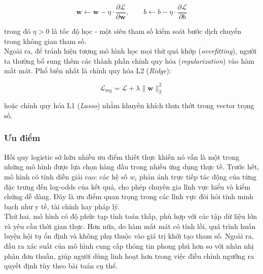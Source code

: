\begin{equation}
  \mathbf{w} \leftarrow \mathbf{w} - \eta \cdot \frac{\partial \mathcal{L}}{\partial \mathbf{w}},
  \qquad
  b \leftarrow b - \eta \cdot \frac{\partial \mathcal{L}}{\partial b}
  \label{eq:update}
\end{equation}
 
\noindent trong đó $\eta > 0$ là tốc độ học - một siêu tham số kiểm soát bước dịch chuyển trong không gian tham số.\\
 
Ngoài ra, để tránh hiện tượng mô hình học mọi thứ quá khớp (\textit{overfitting}), người ta thường bổ sung thêm các thành phần chính quy hóa (\textit{regularization}) vào hàm mất mát. Phổ biến nhất là chính quy hóa L2 (\textit{Ridge}):
 
\begin{equation}
  \mathcal{L}_{\mathrm{reg}}
  = \mathcal{L} + \lambda \|\mathbf{w}\|_{2}^{2}
  \label{eq:l2}
\end{equation}
 
\noindent hoặc chính quy hóa L1 (\textit{Lasso}) nhằm khuyến khích thưa thớt trong vector trọng số.
 
\subsubsection{Ưu điểm}
 
Hồi quy logistic sở hữu nhiều ưu điểm thiết thực khiến nó vẫn là một trong những mô hình được lựa chọn hàng đầu trong nhiều ứng dụng thực tế. Trước hết, mô hình có tính diễn giải cao: các hệ số $w_i$ phản ánh trực tiếp tác động của từng đặc trưng đến log-odds của kết quả, cho phép chuyên gia lĩnh vực hiểu và kiểm chứng dễ dàng. Đây là ưu điểm quan trọng trong các lĩnh vực đòi hỏi tính minh bạch như y tế, tài chính hay pháp lý.\\
 
Thứ hai, mô hình có độ phức tạp tính toán thấp, phù hợp với các tập dữ liệu lớn và yêu cầu thời gian thực. Hơn nữa, do hàm mất mát có tính lồi, quá trình huấn luyện hội tụ ổn định và không phụ thuộc vào giá trị khởi tạo tham số. Ngoài ra, đầu ra xác suất của mô hình cung cấp thông tin phong phú hơn so với nhãn nhị phân đơn thuần, giúp người dùng linh hoạt hơn trong việc điều chỉnh ngưỡng ra quyết định tùy theo bài toán cụ thể.\\
 

